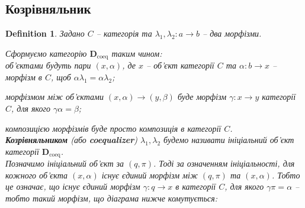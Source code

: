\documentclass[a4paper, 10pt]{article}
\theoremstyle{theoremdd}
\newtheorem{definition}[theorem]{Definition}
\begin{document}
\subsection{Козрівняльник}
\begin{definition}
Задано $C$ -- категорія та $\lambda_1,\lambda_2 \colon a \to b$ -- два морфізми.
\begin{figure}[H]
\centering
{}
\end{figure}
\noindent
Сформуємо категорію $\textbf{D}_{\text{coeq}}$ таким чином:\\
об'єктами будуть пари $(x,\alpha)$, де $x$ -- об'єкт категорії $C$ та $\alpha \colon b \to x$ -- морфізм в $C$, щоб $\alpha \lambda_1 = \alpha \lambda_2$;
\begin{figure}[H]
\centering
{}
\end{figure}
\noindent
морфізмом між об'єктами $(x,\alpha) \to (y,\beta)$ буде морфізм $\gamma \colon x \to y$ категорії $C$, для якого $\gamma \alpha = \beta$;
\begin{figure}[H]
\centering
{}
\end{figure}
\noindent
композицією морфізмів буде просто композиція в категорії $C$.\\
\textbf{Козрівняльником} (або \textbf{coequalizer}) $\lambda_1,\lambda_2$ будемо називати ініціальний об'єкт категорії $\textbf{D}_{\text{coeq}}$.
\bigskip \\
Позначимо ініціальний об'єкт за $(q,\pi)$. Тоді за означенням ініціальності, для кожного об'єкта $(x,\alpha)$ існує єдиний морфізм між $(q,\pi)$ та $(x,\alpha)$. Тобто це означає, що існує єдиний морфізм $\gamma \colon q \to x$ в категорії $C$, для якого $\gamma \pi = \alpha$ -- тобто такий морфізм, що діаграма нижче комутується:
\begin{figure}[H]
\centering
{}
\end{figure}
\end{definition}
\end{document}
